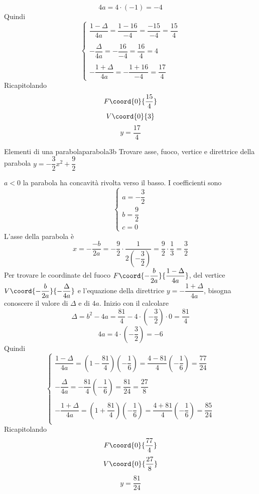 \[4a=4\cdot(-1)=-4\]
Quindi \[\begin{cases}
\dfrac{1-\Delta}{4a}=\dfrac{1-16}{-4}=\dfrac{-15}{-4}=\dfrac{15}{4}\\
\\
-\dfrac{\Delta}{4a}=-\dfrac{16}{-4}=\dfrac{16}{4}=4\\
\\
-\dfrac{1+\Delta}{4a}=-\dfrac{1+16}{-4}=\dfrac{17}{4}
\end{cases} \]
Ricapitolando \[F\coord{0}{\dfrac{15}{4}} \]\[V\coord{0}{3} \]\[y=\dfrac{17}{4} \]
\begin{center}
	
	\label{fig:disegnoparabola3a}
\end{center}
\begin{esempiot}{Elementi di una parabola}{parabola3b}
	Trovare asse, fuoco, vertice e direttrice della parabola $y=-\dfrac{3}{2}x^2+\dfrac{9}{2}$
\end{esempiot}
$a<0$ la parabola ha concavità rivolta verso il basso. I coefficienti sono\[\begin{cases}
a=-\dfrac{3}{2}\\
b=\dfrac{9}{2}\\
c=0
\end{cases} \]
L'asse della parabola è\[x=-\dfrac{-b}{2a}=-\dfrac{9}{2}\cdot\dfrac{1}{2(-\dfrac{3}{2})}=\dfrac{9}{2}\cdot\dfrac{1}{3}=\dfrac{3}{2} \]
Per trovare le coordinate del fuoco $F\coord{-\dfrac{b}{2a}}{\dfrac{1-\Delta}{4a}}$, del vertice $V\coord{-\dfrac{b}{2a}}{-\dfrac{\Delta}{4a}}$ e l'equazione della direttrice $y=-\dfrac{1+\Delta}{4a}$, bisogna conoscere il valore di $\Delta$ e di $4a$. Inizio con il calcolare \[\Delta=b^2-4a=\dfrac{81}{4}-4\cdot(-\dfrac{3}{2})\cdot0=\dfrac{81}{4}\]
\[4a=4\cdot\left(-\dfrac{3}{2}\right)=-6\]
Quindi \[\begin{cases}
\dfrac{1-\Delta}{4a}=\left(1-\dfrac{81}{4}\right)\left(-\dfrac{1}{6}\right)=\dfrac{4-81}{4}\left(-\dfrac{1}{6}\right)=\dfrac{77}{24}\\
\\
-\dfrac{\Delta}{4a}=-\dfrac{81}{4}\left(-\dfrac{1}{6}\right)=\dfrac{81}{24}=\dfrac{27}{8}\\
\\
-\dfrac{1+\Delta}{4a}=\left(1+\dfrac{81}{4}\right)\left(-\dfrac{1}{6}\right)=\dfrac{4+81}{4}\left(-\dfrac{1}{6}\right)=\dfrac{85}{24}\\
\end{cases} \]
Ricapitolando \[F\coord{0}{\dfrac{77}{4}} \]\[V\coord{0}{\dfrac{27}{8}} \]\[y=\dfrac{81}{24} \]
